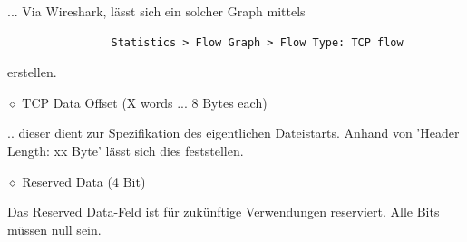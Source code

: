 \documentclass[11pt]{article}
\begin{document}
\begin{enumerate}[\thesection .1]
\begin{addmargin}[1em]{1em}
            ... Via Wireshark, lässt sich ein solcher Graph mittels
            \begin{verbatim}
                Statistics > Flow Graph > Flow Type: TCP flow
            \end{verbatim}
            erstellen.

        \end{addmargin}

        $\diamond$ TCP Data Offset (X words ... 8 Bytes each)
        \begin{addmargin}[1em]{1em}
            .. dieser dient zur Spezifikation des eigentlichen Dateistarts.
            Anhand von 'Header Length: xx Byte' lässt sich dies feststellen.
        \end{addmargin}

        $\diamond$ Reserved Data (4 Bit)
        \begin{addmargin}[1em]{1em}
            Das Reserved Data-Feld ist für zukünftige Verwendungen reserviert. Alle Bits müssen null sein.
        \end{addmargin}


\end{enumerate}
\end{document}
